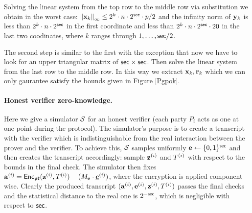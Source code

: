Solving the linear system from the top row to the middle row via substitution we obtain in the worst case: 
${\Vert \mathbf{x}_k \Vert}_\infty \leq 2^k \cdot n \cdot 2^{\mathsf{sec}} \cdot p/2$ and the infinity norm of
$\mathbf{y}_k$ is less than $2^k \cdot n \cdot 2^{\mathsf{sec}}$ in the first coordinate
and less than $2^k \cdot n \cdot 2^{\mathsf{sec}} \cdot 20$ in the last two coodinates,
where $k$ ranges through $1, \dots, \mathsf{sec}/2$. 

The second step is similar to the first with the exception that now we have to look for an 
upper triangular matrix of $\mathsf{sec} \times \mathsf{sec}$. 
Then solve the linear system from the last row to the middle row. 
In this way we extract $\mathbf{x}_k, \mathbf{r}_k$ which we can only gaurantee satisfy the 
bounds given in Figure \ref{Pgpok}.

\paragraph{Honest verifier zero-knowledge.} 
Here we give a simulator $\mathcal{S}$ for an honest verifier (each party $P_i$ acts as one at one point during the protocol). 
The simulator's purpose is to create a transcript with the verifier which is indistinguishable from the real 
interaction between the prover and the verifier. 
To achieve this, $\mathcal{S}$ samples uniformly $\mathbf{e} \leftarrow \{0,1\}^{\mathsf{sec}}$ and then creates the transcript accordingly: 
sample $\mathbf{z}^{(i)}$ and $T^{(i)}$ with respect to the bounds in the final check.
The simulator then fixes $\mathbf{a}^{(i)} = \mathsf{Enc}_{\mathfrak{pk}}(\mathbf{z}^{(i)}, T^{(i)}) - (M_{\mathbf{e}} \cdot \underline{\mathbf{c}}^{(i)})$, where the encryption is applied component-wise. Clearly the produced transcript $(\mathbf{a}^{(i)}, \mathbf{e}^{(i)}, \mathbf{z}^{(i)}, T^{(i)})$ passes the final checks and the statistical distance to the real one is $2^{-\mathsf{sec}}$, which is negligible with respect to $\mathsf{sec}$.

